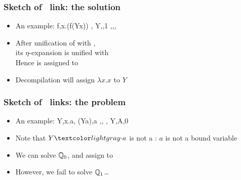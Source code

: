 \documentclass{pres}
\begin{document}
\begin{frame}[fragile]
  \frametitle{Sketch of \maybeeta\ link: the solution}

  \def\var{Y}

  \begin{itemize}
    \item An example: %
      \printAlllSingle
        {{{f,\lambda x.(f\appsep (\var\appsep x))}}}
        {{{,}}}
        {{{\var,,1}}}
        {{{\eta,,,}}}
    \item After unification of  with ,\\
          its $\eta$-expansion is unified with \\
          Hence  is assigned to 
    \item Decompilation will assign $\lambda x.x$ to $\var$
    \end{itemize}

\end{frame}

\begin{frame}[fragile]
  \frametitle{Sketch of \maybelam\ links: the problem}

  \def\var{Y}

  \begin{itemize}
    \item An example: 
      \printAlll
      {{{\var,\lambda x.a},
        {(\var\appsep a),a}}}
      {{{,},
        {,}}}
      {{{\var,A,0}}}
      {{}}
    \item Note that $\var\appsep a$ is not a \maybebeta: $a$ is not a bound variable
    \item We can solve $\mathbb{Q}_0$, and assign  to 
    \item However, we fail to solve $\mathbb{Q}_1$\dots
  \end{itemize}

\end{frame}
\end{document}
